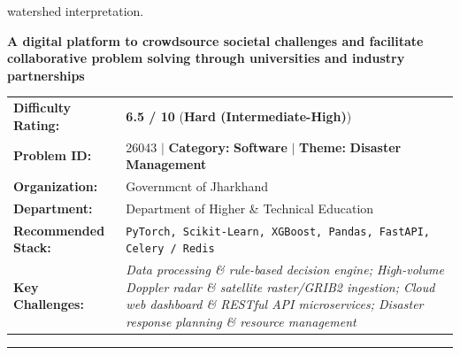 \documentclass[10pt,a4paper]{article}
\begin{document}
\begin{tcolorbox}[pscard, title={"\textbf{SIH26015} \quad $\vert$ \quad Application of Geospatial Techniques for visualization and analysis to inte...}]
watershed interpretation.\par\vspace{0.06cm}

\end{tcolorbox}
\vspace{0.4cm}
{}

\begin{tcolorbox}[pscard, title={"\textbf{SIH26043} \quad $\vert$ \quad A digital platform to crowdsource societal challenges and facilitate collab...}]
\textbf{\large A digital platform to crowdsource societal challenges and facilitate collaborative problem solving through universities and industry partnerships}\\[0.25cm]

\begin{tabular}{@{}lp{12.5cm}@{}}
\textbf{Difficulty Rating:} & \textcolor{diffhard}{\textbf{\Large 6.5 / 10}} \quad (\textbf{Hard (Intermediate-High)}) \\
\textbf{Problem ID:} & 26043 \quad $\vert$ \quad \textbf{Category:} \textbf{Software} \quad $\vert$ \quad \textbf{Theme:} \textbf{Disaster Management} \\
\textbf{Organization:} & Governmcnt of Jharkhand \\
\textbf{Department:} & Department of Higher \& Technical Education \\
\textbf{Recommended Stack:} & \texttt{PyTorch, Scikit-Learn, XGBoost, Pandas, FastAPI, Celery / Redis} \\
\textbf{Key Challenges:} & \textit{\small Data processing \& rule-based decision engine; High-volume Doppler radar \& satellite raster/GRIB2 ingestion; Cloud web dashboard \& RESTful API microservices; Disaster response planning \& resource management} \\
\end{tabular}

\vspace{0.2cm}
\hrule
\vspace{0.2cm}


\end{tcolorbox}
\end{document}
